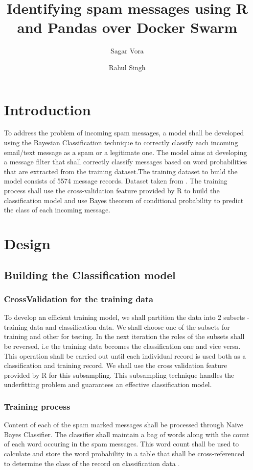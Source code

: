 \documentclass[9pt,twocolumn,twoside]{../../styles/osajnl}
\title{Identifying spam messages using R and Pandas over
  Docker Swarm}
\author[1,*]{Sagar Vora}
\author[1,**]{Rahul Singh}
\affil[1]{School of Informatics and Computing, Bloomington, IN 47408, U.S.A.}
\affil[*]{Corresponding authors: vorasagar7@gmail.com}
\affil[**]{Corresponding authors: rahul\textunderscore singh919@yahoo.com}
\begin{document}
\maketitle

\section{Introduction}

To address the problem of incoming spam messages, a model shall be
developed using the Bayesian Classification technique to correctly
classify each incoming email/text message as a spam or a legitimate
one. The model aims at developing a message filter that shall
correctly classify messages based on word probabilities that are
extracted from the training dataset.The training dataset to build the
model consists of 5574 message records. Dataset taken from
\cite{www-sms-spam-dataset}. The training process shall use the
cross-validation feature provided by R to build the classification
model and use Bayes theorem of conditional probability to predict the
class of each incoming message.

\section{Design}
\subsection{Building the Classification model}

\subsubsection{CrossValidation for the training data}
To develop an efficient training model, we shall partition the data
into 2 subsets - training data and classification data. We shall
choose one of the subsets for training and other for testing. In the
next iteration the roles of the subsets shall be reversed, i.e the
training data becomes the classification one and vice versa. This
operation shall be carried out until each individual record is used
both as a classification and training record. We shall use the cross
validation feature provided by R for this subsampling. This
subsampling technique handles the underfitting problem and guarantees
an effective classification model.


\subsubsection{Training process}
Content of each of the spam marked messages shall be processed through
Naive Bayes Classifier.  The classifier shall maintain a bag of words
along with the count of each word occuring in the spam messages. This
word count shall be used to calculate and store the word probability
in a table that shall be cross-referenced to determine the class of
the record on classification
data \cite{paper-classification-of-email}.
\end{document}
